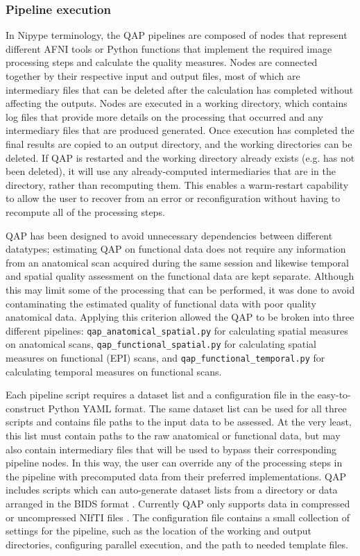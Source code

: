 \documentclass{frontiersSCNS} %
\begin{document}
\subsubsection{Pipeline execution}

In Nipype terminology, the QAP pipelines are composed of nodes that represent different AFNI tools or Python functions that implement the required image processing steps and calculate the quality measures. Nodes are connected together by their respective input and output files, most of which are intermediary files that can be deleted after the calculation has completed without affecting the outputs. Nodes are executed in a working directory, which contains log files that provide more details on the processing that occurred and any intermediary files that are produced generated. Once execution has completed the final results are copied to an output directory, and the working directories can be deleted. If QAP is restarted and the working directory already exists (e.g. has not been deleted), it will use any already-computed intermediaries that are in the directory, rather than recomputing them. This enables a warm-restart capability to allow the user to recover from an error or reconfiguration without having to recompute all of the processing steps.

QAP has been designed to avoid unnecessary dependencies between different datatypes; estimating QAP on functional data does not require any information from an anatomical scan acquired during the same session and likewise temporal and spatial quality assessment on the functional data are kept separate. Although this may limit some of the processing that can be performed, it was done to avoid contaminating the estimated quality of functional data with poor quality anatomical data. Applying this criterion allowed the QAP to be broken into three different pipelines: \texttt{qap\_anatomical\_spatial.py} for calculating spatial measures on anatomical scans, \texttt{qap\_functional\_spatial.py} for calculating spatial measures on functional (EPI) scans, and \texttt{qap\_functional\_temporal.py} for calculating temporal measures on functional scans. 

Each pipeline script requires a dataset list and a configuration file in the easy-to-construct Python YAML format. The same dataset list can be used for all three scripts and contains file paths to the input data to be assessed. At the very least, this list must contain paths to the raw anatomical or functional data, but may also contain intermediary files that will be used to bypass their corresponding pipeline nodes. In this way, the user can override any of the processing steps in the pipeline with precomputed data from their preferred implementations. QAP includes scripts which can auto-generate dataset lists from a directory or data arranged in the BIDS format \citep{gorgolewski_brain_2016}. Currently QAP only supports data in compressed or uncompressed NIfTI files \citep{nifti2004}. The configuration file contains a small collection of settings for the pipeline, such as the location of the working and output directories, configuring parallel execution, and the path to needed template files. 
\end{document}
